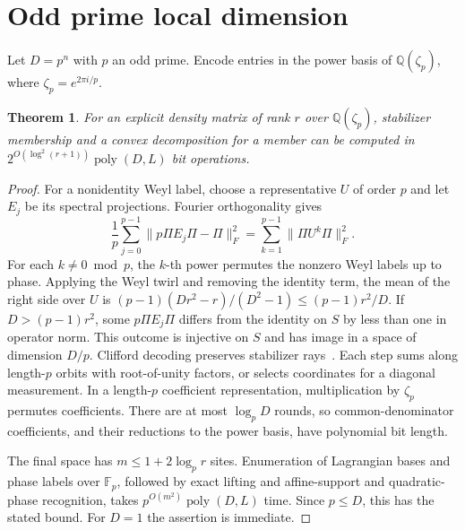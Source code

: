 \documentclass[11pt,letterpaper]{article}
\newtheorem{theorem}{Theorem}[section]
\theoremstyle{definition}
\numberwithin{equation}{section}
\newcommand{\F}{\mathbb F}
\newcommand{\Q}{\mathbb Q}
\begin{document}
\section{Odd prime local dimension}
Let \(D=p^n\) with \(p\) an odd prime. Encode entries in the power basis of \(\Q(\zeta_p)\), where \(\zeta_p=e^{2\pi i/p}\).
\begin{theorem}
For an explicit density matrix of rank \(r\) over \(\Q(\zeta_p)\), stabilizer membership and a convex decomposition for a member can be computed in \(2^{O(\log^2(r+1))}\operatorname{poly}(D,L)\) bit operations.
\end{theorem}
\begin{proof}
For a nonidentity Weyl label, choose a representative \(U\) of order \(p\) and let \(E_j\) be its spectral projections. Fourier orthogonality gives
\[
 \frac1p\sum_{j=0}^{p-1}\|p\Pi E_j\Pi-\Pi\|_F^2
 =\sum_{k=1}^{p-1}\|\Pi U^k\Pi\|_F^2 .
\]
For each \(k\ne0\bmod p\), the \(k\)-th power permutes the nonzero Weyl labels up to phase. Applying the Weyl twirl and removing the identity term, the mean of the right side over \(U\) is \((p-1)(Dr^2-r)/(D^2-1)\le(p-1)r^2/D\). If \(D>(p-1)r^2\), some \(p\Pi E_j\Pi\) differs from the identity on \(S\) by less than one in operator norm. This outcome is injective on \(S\) and has image in a space of dimension \(D/p\). Clifford decoding preserves stabilizer rays~\cite{hddm}. Each step sums along length-\(p\) orbits with root-of-unity factors, or selects coordinates for a diagonal measurement. In a length-\(p\) coefficient representation, multiplication by \(\zeta_p\) permutes coefficients. There are at most \(\log_pD\) rounds, so common-denominator coefficients, and their reductions to the power basis, have polynomial bit length.

The final space has \(m\le1+2\log_p r\) sites. Enumeration of Lagrangian bases and phase labels over \(\F_p\), followed by exact lifting and affine-support and quadratic-phase recognition, takes \(p^{O(m^2)}\operatorname{poly}(D,L)\) time. Since \(p\le D\), this has the stated bound. For \(D=1\) the assertion is immediate.


\end{proof}
\end{document}
